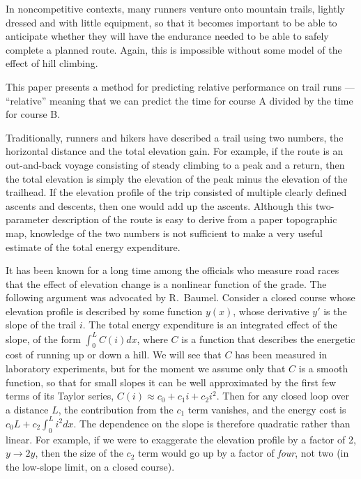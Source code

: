\documentclass[10pt,letterpaper]{article}
\begin{document}
In noncompetitive contexts, many runners venture onto mountain trails,
lightly dressed and with little equipment, so that it becomes important to be able
to anticipate whether they will have the endurance needed to be able to safely complete a planned route.
Again, this is impossible without some model of the effect of hill climbing.


This paper presents a method for predicting relative performance on trail runs --- ``relative''
meaning that we can predict the time for course A divided by the time for course B.

Traditionally, runners and hikers have described a trail using two numbers, the horizontal distance and the total elevation gain.
For example, if the route is an out-and-back voyage consisting of steady climbing to a peak and
a return, then the total elevation is simply the elevation of the peak minus the elevation of
the trailhead. If the elevation profile of the trip consisted of multiple clearly defined ascents and descents,
then one would add up the ascents. Although this two-parameter description of the route is
easy to derive from a paper topographic map, knowledge of the two numbers is not sufficient
to make a very useful estimate of the total energy expenditure.

It has been known for a long
time among the officials who measure road races that the effect
of elevation change is a nonlinear function of the grade. The following argument 
was advocated by R.~Baumel.\cite{baumel}
Consider a closed course whose elevation
profile is described by some function $y(x)$, whose derivative $y'$ is the slope of the trail $i$.
The total energy expenditure is an integrated effect of the slope, of the form $\int_0^L C(i)dx$,
where $C$ is a function that describes the energetic cost of running up or down a hill.
We will see that $C$ has been measured in laboratory experiments, but for the moment we assume
only that $C$ is a smooth function, so that for small slopes it can be well approximated by the first few terms
of its Taylor series, $C(i)\approx c_0+c_1 i+c_2 i^2$. Then for any closed loop over a distance $L$,
the contribution from the $c_1$ term vanishes, and the energy cost is $c_0 L+c_2 \int_0^L i^2 dx$.
The dependence on the slope is therefore quadratic rather than linear. For example, if we were to exaggerate the
elevation profile by a factor of 2, $y\rightarrow 2y$, then the size of the $c_2$ term would go up by
a factor of \emph{four}, not two (in the low-slope limit, on a closed course).
\end{document}

